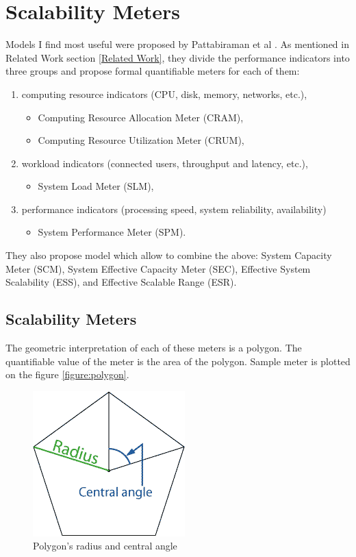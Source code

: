 \documentclass{uvamscse}
\begin{document}
\section{Scalability Meters}
Models I find most useful were proposed by Pattabiraman et al \cite{Models}. As mentioned in Related Work section \ref{Related Work}, they divide the performance indicators into three groups and propose formal quantifiable meters for each of them:
\begin{enumerate}
  \item computing resource indicators (CPU, disk, memory, networks, etc.),
  \begin{itemize}
    \item Computing Resource Allocation Meter (CRAM),
    \item Computing Resource Utilization Meter (CRUM),
  \end{itemize}
  \item workload indicators (connected users, throughput and latency, etc.),
  \begin{itemize}
    \item System Load Meter (SLM),
  \end{itemize}
  \item performance indicators (processing speed, system reliability, availability)
  \begin{itemize}
    \item System Performance Meter (SPM).
  \end{itemize}
\end{enumerate}
They also propose model which allow to combine the above: System Capacity Meter (SCM), System Effective Capacity Meter (SEC), Effective System Scalability (ESS), and Effective Scalable Range (ESR).

\subsection{Scalability Meters}

The geometric interpretation of each of these meters is a polygon. The quantifiable value of the meter is the area of the polygon. Sample meter is plotted on the figure \ref{figure:polygon}.

\begin{figure}[h]
\centering
\includegraphics[scale=0.5]{angleradius}
\caption{Polygon's radius and central angle}
\label{figure:polygon1}
\end{figure}
\end{document}
